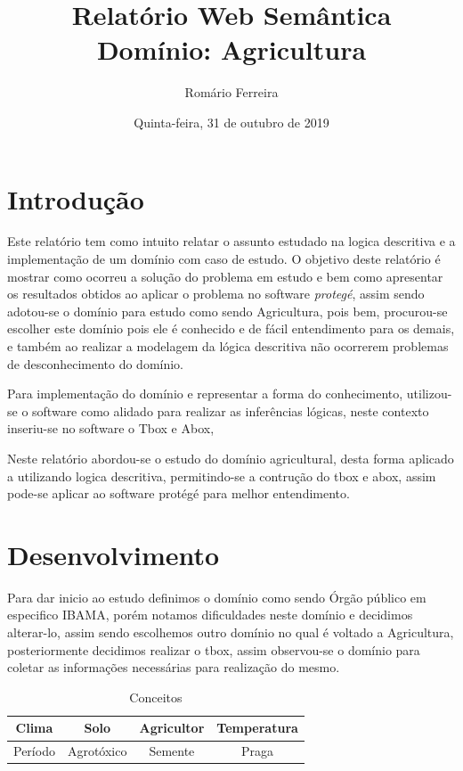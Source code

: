\documentclass{article}
\title{Relatório Web Semântica \\ \textbf{Domínio}: Agricultura}
\author{Romário Ferreira}
\date{Quinta-feira, 31 de outubro de 2019}
\begin{document}
\maketitle

\section{Introdução}
Este relatório tem como intuito relatar o assunto estudado na logica descritiva e a implementação 
de um domínio com caso de estudo. O objetivo deste relatório é mostrar como ocorreu a solução do problema em estudo e bem como apresentar os resultados obtidos ao aplicar o problema no software 
\textit{protegé}, assim sendo adotou-se o domínio para estudo como sendo Agricultura, pois bem, procurou-se escolher este domínio pois ele é conhecido e de fácil entendimento para os demais, e também ao realizar a modelagem da lógica descritiva não ocorrerem problemas de desconhecimento do domínio.

Para implementação do domínio e representar a forma do conhecimento, utilizou-se o software como alidado para realizar as inferências lógicas, neste contexto inseriu-se no software o Tbox e Abox,


Neste relatório abordou-se o estudo do domínio agricultural, desta forma aplicado a utilizando logica descritiva, permitindo-se a contrução do tbox e abox, assim pode-se aplicar ao software protégé para melhor entendimento.


\section{Desenvolvimento}
    Para dar inicio ao estudo definimos o domínio como sendo Órgão público em especifico IBAMA, porém notamos dificuldades neste domínio e decidimos alterar-lo, assim sendo escolhemos outro domínio
    no qual é voltado a Agricultura, posteriormente decidimos realizar o tbox, assim observou-se o 
    domínio para coletar as informações necessárias para realização do mesmo.
    
    \begin{table}[!ht]
        \centering
        \begin{tabular}{c|c|c|c}
            Clima   &   Solo    &  Agricultor & Temperatura \\
            \hline
            Período &  Agrotóxico & Semente  & Praga  \\
        \end{tabular}
        \caption{Conceitos}
        \label{tab:my_label}
    \end{table}
    
\end{document}
